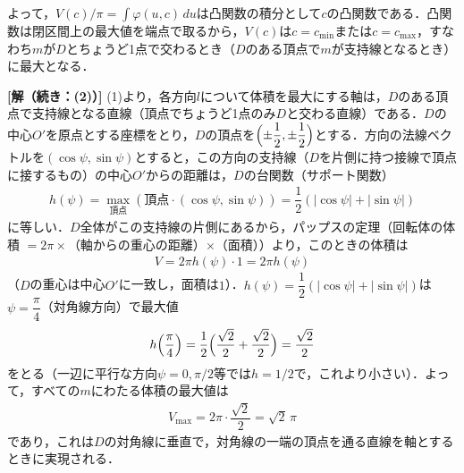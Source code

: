 \documentclass[../../main.tex]{subfiles}
\begin{document}
よって，$V(c)/\pi=\int\varphi(u,c)\,du$は凸関数の積分として$c$の凸関数である．凸関数は閉区間上の最大値を端点で取るから，$V(c)$は$c=c_{\min}$または$c=c_{\max}$，すなわち$m$が$D$とちょうど1点で交わるとき（$D$のある頂点で$m$が支持線となるとき）に最大となる．

{\bf [解（続き：(2)）]}
(1)より，各方向$l$について体積を最大にする軸は，$D$のある頂点で支持線となる直線（頂点でちょうど1点のみ$D$と交わる直線）である．$D$の中心$O'$を原点とする座標をとり，$D$の頂点を$\Bigl(\pm\dfrac{1}{2},\pm\dfrac{1}{2}\Bigr)$とする．方向の法線ベクトルを$(\cos\psi,\sin\psi)$とすると，この方向の支持線（$D$を片側に持つ接線で頂点に接するもの）の中心$O'$からの距離は，$D$の台関数（サポート関数）
\begin{align}
  h(\psi)=\max_{\text{頂点}}(\text{頂点}\cdot(\cos\psi,\sin\psi))=\dfrac{1}{2}(|\cos\psi|+|\sin\psi|)
\end{align}
に等しい．$D$全体がこの支持線の片側にあるから，パップスの定理（回転体の体積 $=2\pi\times$（軸からの重心の距離）$\times$（面積））より，このときの体積は
\begin{align}
  V=2\pi h(\psi)\cdot1=2\pi h(\psi)
\end{align}
（$D$の重心は中心$O'$に一致し，面積は$1$）．$h(\psi)=\dfrac{1}{2}(|\cos\psi|+|\sin\psi|)$は$\psi=\dfrac{\pi}{4}$（対角線方向）で最大値
\begin{align}
  h\Bigl(\dfrac{\pi}{4}\Bigr)=\dfrac{1}{2}\Bigl(\dfrac{\sqrt{2}}{2}+\dfrac{\sqrt{2}}{2}\Bigr)=\dfrac{\sqrt{2}}{2}
\end{align}
をとる（一辺に平行な方向$\psi=0,\pi/2$等では$h=1/2$で，これより小さい）．よって，すべての$m$にわたる体積の最大値は
\begin{align}
  V_{\max}=2\pi\cdot\dfrac{\sqrt{2}}{2}=\sqrt{2}\,\pi
\end{align}
であり，これは$D$の対角線に垂直で，対角線の一端の頂点を通る直線を軸とするときに実現される．
\end{document}
